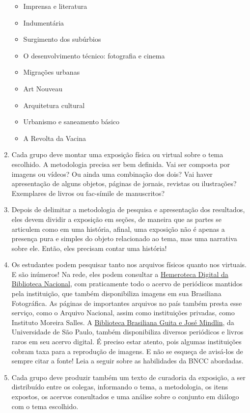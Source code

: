 \documentclass[12pt]{extarticle}
\begin{document}
\begin{enumerate}
\begin{itemize}
\item
  Imprensa e literatura
\item
  Indumentária
\item
  Surgimento dos subúrbios
\item
  O desenvolvimento técnico: fotografia e cinema
\item
  Migrações urbanas
\item
  Art Nouveau
\item
  Arquitetura cultural
\item
  Urbanismo e saneamento básico
\item
  A Revolta da Vacina
\end{itemize}

\item
Cada grupo deve montar uma exposição física ou virtual sobre o tema
escolhido. A metodologia precisa ser bem definida. Vai ser composta por
imagens ou vídeos? Ou ainda uma combinação dos dois? Vai haver
apresentação de alguns objetos, páginas de jornais, revistas ou
ilustrações? Exemplares de livros ou fac-símile de manuscritos?


\item
Depois de delimitar a metodologia de pesquisa e apresentação dos
resultados, eles devem dividir a exposição em seções, de maneira que as
partes se articulem como em uma história, afinal, uma exposição não é
apenas a presença pura e simples do objeto relacionado ao tema, mas uma
narrativa sobre ele. Então, eles precisam contar uma história!

\item
Os estudantes podem pesquisar tanto nos arquivos físicos quanto nos
virtuais. E são inúmeros! Na rede, eles podem consultar a 
\href{https://bndigital.bn.gov.br/hemeroteca-digital/}%
{Hemeroteca Digital da Biblioteca Nacional}, com praticamente todo o acervo de
periódicos mantidos pela instituição, que também disponibiliza imagens
em sua Brasiliana Fotográfica. As páginas de importantes arquivos no
país também presta esse serviço, como o Arquivo Nacional, assim como
instituições privadas, como Instituto Moreira Salles. A 
\href{https://www.bbm.usp.br/pt-br/}%
{Biblioteca Brasiliana Guita e José Mindlin}, da Universidade de São Paulo, também
disponibiliza diversos periódicos e livros raros em seu acervo digital.
É preciso estar atento, pois algumas instituições cobram taxa para a reprodução
de imagens. E não se esqueça de avisá-los de sempre citar a fonte! 
Leia a seguir sobre as habilidades da BNCC abordadas. 



\item
Cada grupo deve produzir também um texto de curadoria da exposição, a
ser distribuído entre os colegas, informando o tema, a metodologia, os
itens expostos, os acervos consultados e uma análise sobre o conjunto em
diálogo com o tema escolhido.
\end{enumerate}
\end{document}
